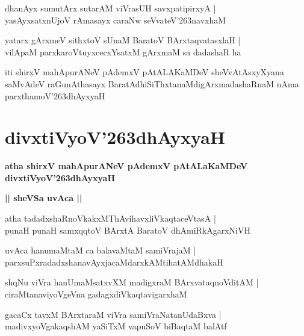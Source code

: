 \documentclass[twoside,12pt,openright]{book}
\def\S{\char'263}
\newcounter{shloka}[chapter]
\def\uvaca#1{\centerline{{\large\textbf{#1}}}}
\begin{document}
\begin{shloka}%
dhanAyx sumutArx sutarAM viVrasUH savxpatipirxyA |\\
yasAyxsatxnUjoV rAmasayx caraNw seVvateV\S navxhaM
\end{shloka}

\begin{shloka}%
yatarx gArxmeV sithxtoV sUnaM BaratoV BArxtaqvatasxlaH |\\
vilApaM parxkaroVtuyxcecxYsatxM gArxmaM sa dadashaR ha
\end{shloka}


\begin{center}
iti shirxV mahApurANeV pAdemxV pAtALAKaMDeV sheVvAtAsxyXyana saMvAdeV raGunAthasayx 
BaratAdhiSiThxtanaMdigArxmadashaRnaM nAma parxthamoV\S dhAyxyaH
\end{center}


\chapter{divxtiVyoV\S dhAyxyaH}

\begin{center}
{\LARGE\bfseries atha shirxV mahApurANeV pAdemxV pAtALaKaMDeV divxtiVyoV\S dhAyxyaH}
\end{center}

\uvaca{|| sheVSa uvAca ||}

\begin{shloka}%
atha tadadxshaRnoVkakxMThAvihavxliVkaqtaceVtasA |\\
punaH punaH samxqqtoV BArxtA BaratoV dhAmiRkAgarxNiVH
\end{shloka}

\begin{shloka}%
uvAca hanumaMtaM ca balavaMtaM samiVrajaM |\\
parxsuPxradadxshanavAyxjacaMdarxkAMtihatAMdhakaH
\end{shloka}

\begin{shloka}%
shqNu viVra hanUmaMsatxvXM madigxraM BArxvataqnoVditAM |\\
ciraMtanaviyoVgeVna gadagxdiVkaqtavigarxhaM 
\end{shloka}

\begin{shloka}%
gacaCx tavxM BArxtaraM viVra samiVraNatanUdaBxva |\\
madivxyoVgakaqshAM yaSiTxM vapuSoV biBaqtaM balAtf 
\end{shloka}
\end{document}
